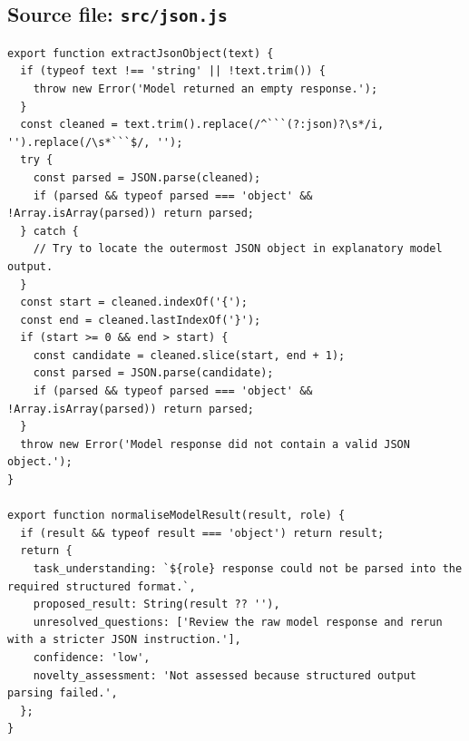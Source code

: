\documentclass[10pt,a4paper]{article}
\begin{document}
\subsection{Source file: \texttt{src/json.js}}
\begin{lstlisting}
export function extractJsonObject(text) {
  if (typeof text !== 'string' || !text.trim()) {
    throw new Error('Model returned an empty response.');
  }
  const cleaned = text.trim().replace(/^```(?:json)?\s*/i, '').replace(/\s*```$/, '');
  try {
    const parsed = JSON.parse(cleaned);
    if (parsed && typeof parsed === 'object' && !Array.isArray(parsed)) return parsed;
  } catch {
    // Try to locate the outermost JSON object in explanatory model output.
  }
  const start = cleaned.indexOf('{');
  const end = cleaned.lastIndexOf('}');
  if (start >= 0 && end > start) {
    const candidate = cleaned.slice(start, end + 1);
    const parsed = JSON.parse(candidate);
    if (parsed && typeof parsed === 'object' && !Array.isArray(parsed)) return parsed;
  }
  throw new Error('Model response did not contain a valid JSON object.');
}

export function normaliseModelResult(result, role) {
  if (result && typeof result === 'object') return result;
  return {
    task_understanding: `${role} response could not be parsed into the required structured format.`,
    proposed_result: String(result ?? ''),
    unresolved_questions: ['Review the raw model response and rerun with a stricter JSON instruction.'],
    confidence: 'low',
    novelty_assessment: 'Not assessed because structured output parsing failed.',
  };
}
\end{lstlisting}
\end{document}
